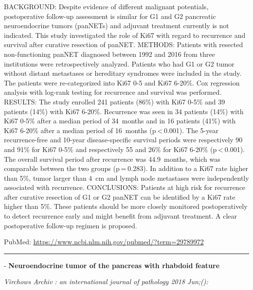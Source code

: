 \documentclass[]{article}
\begin{document}
BACKGROUND: Despite evidence of different malignant potentials,
postoperative follow-up assessment is similar for G1 and G2 pancreatic
neuroendocrine tumors (panNETs) and adjuvant treatment currently is not
indicated. This study investigated the role of Ki67 with regard to
recurrence and survival after curative resection of panNET. METHODS:
Patients with resected non-functioning panNET diagnosed between 1992 and
2016 from three institutions were retrospectively analyzed. Patients who
had G1 or G2 tumor without distant metastases or hereditary syndromes
were included in the study. The patients were re-categorized into Ki67
0-5 and Ki67 6-20\%. Cox regression analysis with log-rank testing for
recurrence and survival was performed. RESULTS: The study enrolled 241
patients (86\%) with Ki67 0-5\% and 39 patients (14\%) with Ki67 6-20\%.
Recurrence was seen in 34 patients (14\%) with Ki67 0-5\% after a median
period of 34~months and in 16 patients (41\%) with Ki67 6-20\% after a
median period of 16~months (p \textless{} 0.001). The 5-year
recurrence-free and 10-year disease-specific survival periods were
respectively 90 and 91\% for Ki67 0-5\% and respectively 55 and 26\% for
Ki67 6-20\% (p \textless{} 0.001). The overall survival period after
recurrence was 44.9~months, which was comparable between the two groups
(p = 0.283). In addition to a Ki67 rate higher than 5\%, tumor larger
than 4~cm and lymph node metastases were independently associated with
recurrence. CONCLUSIONS: Patients at high risk for recurrence after
curative resection of G1 or G2 panNET can be identified by a Ki67 rate
higher than 5\%. These patients should be more closely monitored
postoperatively to detect recurrence early and might benefit from
adjuvant treatment. A clear postoperative follow-up regimen is proposed.

PubMed: \url{https://www.ncbi.nlm.nih.gov/pubmed/?term=29789972}

{}

{}

\begin{center}\rule{0.5\linewidth}{\linethickness}\end{center}

 - \textbf{Neuroendocrine tumor of the pancreas with rhabdoid feature}

\emph{Virchows Archiv : an international journal of pathology 2018
Jun;():}
\end{document}
